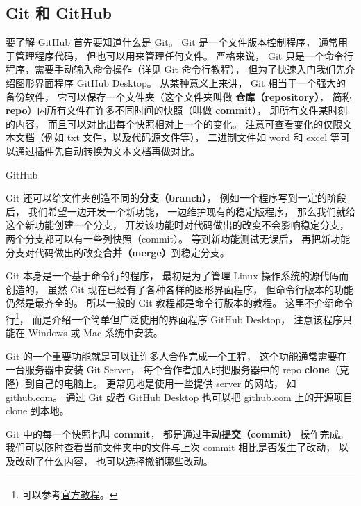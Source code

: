 

\begin{issues}
\issueTODO
\end{issues}

\subsection{Git 和 GitHub}
要了解 GitHub 首先要知道什么是 Git。 Git 是一个文件版本控制程序， 通常用于管理程序代码， 但也可以用来管理任何文件。 严格来说， Git 只是一个命令行程序，需要手动输入命令操作（详见 Git 命令行教程）， 但为了快速入门我们先介绍图形界面程序 GitHub Desktop。 从某种意义上来讲， Git 相当于一个强大的备份软件， 它可以保存一个文件夹（这个文件夹叫做 \textbf{仓库（repository）}， 简称 \textbf{repo}）内所有文件在许多不同时间的快照（叫做 \textbf{commit}）， 即所有文件某时刻的内容， 而且可以对比出每个快照相对上一个的变化。 注意可查看变化的仅限文本文档（例如 txt 文件，以及代码源文件等）， 二进制文件如 word 和 excel 等可以通过插件先自动转换为文本文档再做对比。

GitHub 

Git 还可以给文件夹创造不同的\textbf{分支（branch）}， 例如一个程序写到一定的阶段后， 我们希望一边开发一个新功能， 一边维护现有的稳定版程序， 那么我们就给这个新功能创建一个分支， 开发该功能时对代码做出的改变不会影响稳定分支， 两个分支都可以有一些列快照（commit）。 等到新功能测试无误后， 再把新功能分支对代码做出的改变\textbf{合并（merge）}到稳定分支。

Git 本身是一个基于命令行的程序， 最初是为了管理 Linux 操作系统的源代码而创造的， 虽然 Git 现在已经有了各种各样的图形界面程序， 但命令行版本的功能仍然是最齐全的。 所以一般的 Git 教程都是命令行版本的教程。 这里不介绍命令行\footnote{可以参考\href{https://git-scm.com/book/en/v2}{官方教程}。}， 而是介绍一个简单但广泛使用的界面程序 GitHub Desktop， 注意该程序只能在 Windows 或 Mac 系统中安装。

Git 的一个重要功能就是可以让许多人合作完成一个工程， 这个功能通常需要在一台服务器中安装 Git Server， 每个合作者加入时把服务器中的 repo \textbf{clone}（克隆）到自己的电脑上。 更常见地是使用一些提供 server 的网站， 如 \href{https://github.com}{github.com}。 通过 Git 或者 GitHub Desktop 也可以把 github.com 上的开源项目 clone 到本地。

Git 中的每一个快照也叫 \textbf{commit}， 都是通过手动\textbf{提交（commit）} 操作完成。 我们可以随时查看当前文件夹中的文件与上次 commit 相比是否发生了改动， 以及改动了什么内容， 也可以选择撤销哪些改动。
 
